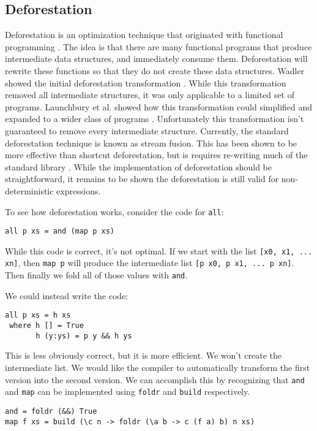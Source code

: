 \subsection{Deforestation}
Deforestation is an optimization technique that originated with functional programming \cite{deforestation_wadler}.
The idea is that there are many functional programs that produce intermediate data structures, and immediately consume them.
Deforestation will rewrite these functions so that they do not create these data structures.
Wadler showed the initial deforestation transformation \cite{deforestation_wadler}.
While this transformation removed all intermediate structures, it was only applicable to a limited set of programs.
Launchbury et al. showed how this transformation could simplified and expanded to a wider class of programs \cite{shortcut_deforestation}.
Unfortunately this transformation isn't guaranteed to remove every intermediate structure.
Currently, the standard deforestation technique is known as stream fusion.
This has been shown to be more effective than shortcut deforestation, 
but is requires re-writing much of the standard library \cite{stream}.
While the implementation of deforestation should be straightforward,
it remains to be shown the deforestation is still valid for non-deterministic expressions.

To see how deforestation works, consider the code for \texttt{all}:
\begin{verbatim}
all p xs = and (map p xs)
\end{verbatim}
While this code is correct, it's not optimal.
If we start with the list \texttt{[x0, x1, ... xn]}, then \texttt{map p} will produce the intermediate list
\texttt{[p x0, p x1, ... p xn]}.
Then finally we fold all of those values with \texttt{and}.

We could instead write the code:
\begin{verbatim}
all p xs = h xs
 where h [] = True
       h (y:ys) = p y && h ys
\end{verbatim}
This is less obviously correct, but it is more efficient.  We won't create the intermediate list.
We would like the compiler to automatically transform the first version into the second version.
We can accomplish this by recognizing that \texttt{and} and \texttt{map} can be implemented using \texttt{foldr} and \texttt{build}
respectively.

\begin{verbatim}
and = foldr (&&) True
map f xs = build (\c n -> foldr (\a b -> c (f a) b) n xs)
\end{verbatim}

